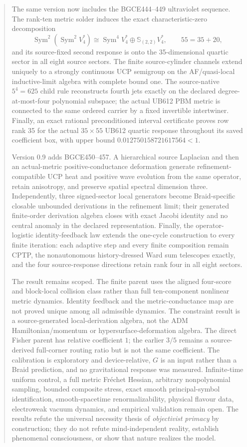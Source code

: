 \documentclass[11pt]{article}
\theoremstyle{definition}
\theoremstyle{remark}
\newcommand{\Sym}{\operatorname{Sym}}
\begin{document}
\begin{abstract}
The same version now includes the BGCE444--449 ultraviolet sequence. The rank-ten metric solder induces the exact characteristic-zero decomposition
\[
 \Sym^2(\Sym^2V_4^*)\cong \Sym^4V_4^*\oplus\mathbb S_{(2,2)}V_4^*,
 \qquad 55=35+20,
\]
and its source-fixed second response is onto the 35-dimensional quartic sector in all eight source sectors. The finite source-cylinder channels extend uniquely to a strongly continuous UCP semigroup on the AF/quasi-local inductive-limit algebra with complete bound one. The source-native $5^4=625$ child rule reconstructs fourth jets exactly on the declared degree-at-most-four polynomial subspace; the actual UB612 PBM metric is connected to the same ordered carrier by a fixed invertible intertwiner. Finally, an exact rational preconditioned interval certificate proves row rank 35 for the actual $35\times55$ UB612 quartic response throughout its saved coefficient box, with upper bound $0.012750158721617564<1$.

Version 0.9 adds BGCE450--457. A hierarchical source Laplacian and then an actual-metric positive-conductance deformation generate refinement-compatible UCP heat and positive wave evolution from the same operator, retain anisotropy, and preserve spatial spectral dimension three. Independently, three signed-sector local generators become Braid-specific closable unbounded derivations in the refinement limit; their generated finite-order derivation algebra closes with exact Jacobi identity and no central anomaly in the declared representation. Finally, the operator-logistic identity-feedback law extends the one-cycle construction to every finite iteration: each adaptive step and every finite composition remain CPTP, the nonautonomous history-dressed Ward sum telescopes exactly, and the four source-response directions retain rank four in all eight sectors.

The result remains scoped. The finite parent uses the aligned four-score and block-local collision class rather than full ten-component nonlinear metric dynamics. Identity feedback and the metric-conductance map are not proved unique among all admissible dynamics. The constraint result is a source-generated local-derivation algebra, not the ADM Hamiltonian/momentum or hypersurface-deformation algebra. The direct Fisher parent has relative coefficient $1$; the earlier $3/5$ remains a source-derived full-corner routing ratio but is not the same coefficient. The calibration is exploratory and device-relative, $G$ is an input rather than a Braid prediction, and no gravitational response was measured. Infinite-time uniform control, a full metric Fr\'echet Hessian, arbitrary nonpolynomial sampling, bounded composite stress, exact smooth principal-symbol identification, smooth-spacetime renormalizability, physical flavour data, electroweak vacuum dynamics, and empirical validation remain open. The results refute the universal necessity thesis of \emph{objectivist primacy} by construction; they do not refute mind-independent reality, establish phenomenal consciousness, or show that nature realizes the model.
\end{abstract}
\end{document}
